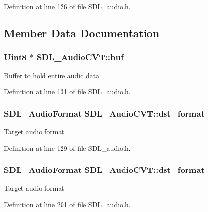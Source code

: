 Definition at line 126 of file S\+D\+L\+\_\+audio.\+h.



\subsection{Member Data Documentation}
\hypertarget{structSDL__AudioCVT_af42eb88b79cf9180670a5122c2c82671}{
\subsubsection[{buf}]{\setlength{\rightskip}{0pt plus 5cm}Uint8 $\ast$ S\+D\+L\+\_\+\+Audio\+C\+V\+T\+::buf}}\label{structSDL__AudioCVT_af42eb88b79cf9180670a5122c2c82671}
Buffer to hold entire audio data 

Definition at line 131 of file S\+D\+L\+\_\+audio.\+h.

\hypertarget{structSDL__AudioCVT_a8f890d017be857a3b048bf00525736c6}{
\subsubsection[{dst\+\_\+format}]{\setlength{\rightskip}{0pt plus 5cm}S\+D\+L\+\_\+\+Audio\+Format S\+D\+L\+\_\+\+Audio\+C\+V\+T\+::dst\+\_\+format}}\label{structSDL__AudioCVT_a8f890d017be857a3b048bf00525736c6}
Target audio format 

Definition at line 129 of file S\+D\+L\+\_\+audio.\+h.

\hypertarget{structSDL__AudioCVT_a8f890d017be857a3b048bf00525736c6}{
\subsubsection[{dst\+\_\+format}]{\setlength{\rightskip}{0pt plus 5cm}S\+D\+L\+\_\+\+Audio\+Format S\+D\+L\+\_\+\+Audio\+C\+V\+T\+::dst\+\_\+format}}\label{structSDL__AudioCVT_a8f890d017be857a3b048bf00525736c6}
Target audio format 

Definition at line 201 of file S\+D\+L\+\_\+audio.\+h.


